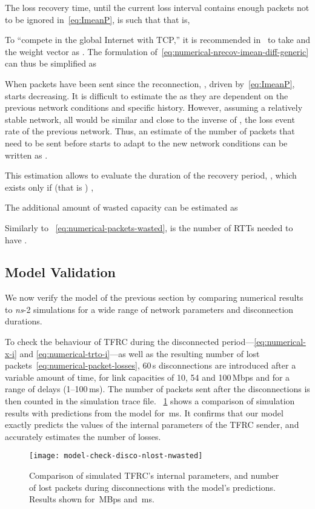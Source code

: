 \documentclass[twocolumn]{nictatechreport}
\newcommand{\ns}{\textit{ns}}
\begin{document}
The loss recovery time, until the current loss interval contains enough packets
not to be ignored in~\eqref{eq:ImeanP}, is such that  that is,


To ``compete in the global Internet with TCP,'' it is recommended
in~\cite{rfc5348} to take  and the weight vector as . The formulation
of~\eqref{eq:numerical-nrecov-imean-diff-generic} can thus be simplified as

When  packets have been sent since the reconnection,
, driven by~\eqref{eq:ImeanP}, starts decreasing. It is difficult to estimate the
 as they are dependent on the previous network conditions and specific
history. However, assuming a relatively stable network, all  would be
similar and close to the inverse of , the loss event rate of the previous
network. Thus, an estimate of the number of packets that need to be sent before
 starts to adapt to the new network conditions can be written as
.

This estimation allows to evaluate the duration of the recovery period,
, which exists only if
(that is ) ,


The additional amount of wasted capacity can be estimated as 

Similarly to ~\eqref{eq:numerical-packets-wasted},  is the
number of RTTs needed to have .

\subsection{Model Validation}

We now verify the model of the previous section by comparing numerical
results to \ns-2 simulations for a wide range of network parameters and
disconnection durations.

To check the behaviour of TFRC during the disconnected
period---\eqref{eq:numerical-x-i} and \eqref{eq:numerical-trto-i}---as well as
the resulting number of lost packets~\eqref{eq:numerical-packet-losses}, 60\,s
disconnections are introduced after a variable amount of time, for link
capacities of 10, 54 and 100\,Mbps and for a range of delays (1--100\,ms).  The
number of packets sent after the disconnections is then counted in the
simulation trace file.  \figurename~\ref{fig:model-check-disco-nlost-nwasted}
shows a comparison of simulation results with predictions from the model for
\,ms. It confirms that our model exactly predicts the values of the internal
parameters of the TFRC sender, and accurately estimates the number of losses.

\begin{figure}[tb]
  \begin{center}
    \texttt{[image: model-check-disco-nlost-nwasted]}
  \end{center}

  \caption[TFRC model validation (internal parameters, lost packets and wasted
  capacity)]{Comparison of simulated TFRC's internal parameters, and number of
  lost packets during disconnections with the model's predictions. Results shown
  for \,MBps and \,ms.}

  \label{fig:model-check-disco-nlost-nwasted}
\end{figure}
\end{document}

